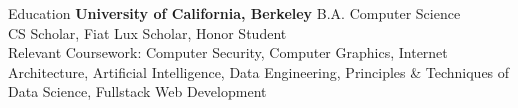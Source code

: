 \documentclass{resume}
\begin{document}

\begin{rSection}{Education}
\textbf{University of California, Berkeley} 
B.A. Computer Science\\
CS Scholar, Fiat Lux Scholar, Honor Student\\
Relevant Coursework: Computer Security, Computer Graphics, Internet Architecture, Artificial Intelligence, Data Engineering, Principles \& Techniques of Data Science, Fullstack Web Development
\end{rSection}

\end{document}
